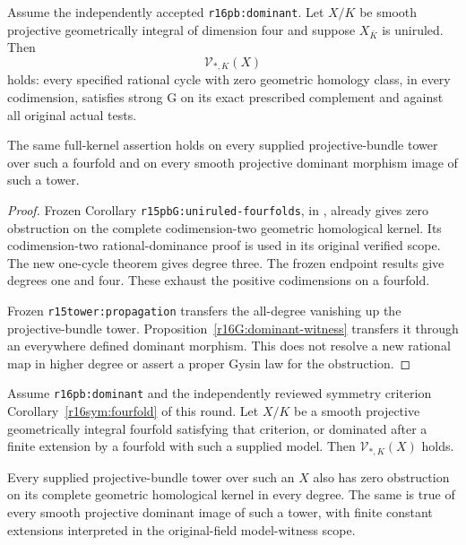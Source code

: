\begin{corollary}
\label{r16G:uniruled-fourfolds}
Assume the independently accepted
\texttt{r16pb:dominant}.  Let $X/K$ be smooth projective
geometrically integral of dimension four and suppose
$X_{\bar K}$ is uniruled.  Then
\[
                         \mathcal V_{*,K}(X)
\tag{GC16.8}\label{r16G:uniruled-all}
\]
holds: every specified rational cycle with zero geometric
homology class, in every codimension, satisfies strong G
on its exact prescribed complement and against all
original actual tests.

The same full-kernel assertion holds on every supplied
projective-bundle tower over such a fourfold and on every
smooth projective dominant morphism image of such a tower.
\end{corollary}

\begin{proof}
Frozen Corollary \texttt{r15pbG:uniruled-fourfolds}, in
,
already gives zero obstruction on the complete
codimension-two geometric homological kernel.  Its
codimension-two rational-dominance proof is used in its
original verified scope.  The new one-cycle theorem
gives degree three.  The frozen endpoint results give
degrees one and four.  These exhaust the positive
codimensions on a fourfold.

Frozen \texttt{r15tower:propagation} transfers the
all-degree vanishing up the projective-bundle tower.
Proposition~\ref{r16G:dominant-witness} transfers it
through an everywhere defined dominant morphism.  This
does not resolve a new rational map in higher degree
or assert a proper Gysin law for the obstruction.
\end{proof}

\begin{corollary}
\label{r16G:symmetric-fourfolds}
Assume \texttt{r16pb:dominant} and the independently
reviewed symmetry criterion
Corollary~\ref{r16sym:fourfold} of this round.
Let $X/K$ be a smooth projective geometrically integral
fourfold satisfying that criterion, or dominated after
a finite extension by a fourfold with such a supplied
model.  Then $\mathcal V_{*,K}(X)$ holds.

Every supplied projective-bundle tower over such an $X$
also has zero obstruction on its complete geometric
homological kernel in every degree.  The same is true
of every smooth projective dominant image of such a
tower, with finite constant extensions interpreted in
the original-field model-witness scope.
\end{corollary}

